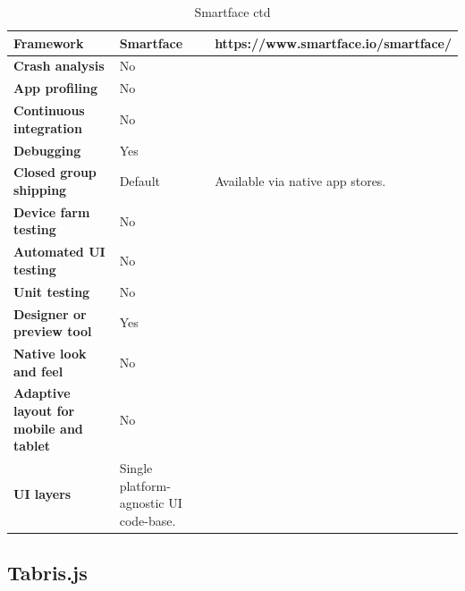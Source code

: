 \documentclass[english,master,public,dept460,male,cpdeclaration,oneside]{diploma}
\begin{document}
\begin{table}[!h]
	\centering
	\caption{Smartface ctd}
	\begin{tabular}{p{} | p{} | p{}}
		\toprule		
		\textbf{Framework} & \textbf{Smartface} & https://www.smartface.io/smartface/ \\
		\midrule
		\textbf{Crash analysis} & No & \\			
		\midrule
		\textbf{App profiling} & No & \\			
		\midrule
		\textbf{Continuous integration} & No & \\			
		\midrule
		\textbf{Debugging} & Yes & \\			
		\midrule
		\textbf{Closed group shipping} & Default & Available via native app stores. \\			
		\midrule
		\textbf{Device farm testing} & No & \\			
		\midrule
		\textbf{Automated UI testing} & No & \\			
		\midrule
		\textbf{Unit testing} & No & \\			
		\midrule
		\textbf{Designer or preview tool} & Yes & \\			
		\midrule
		\textbf{Native look and feel} & No & \\			
		\midrule
		\textbf{Adaptive layout for mobile and tablet} & No & \\			
		\midrule		
		\textbf{UI layers} & Single platform-agnostic UI code-base. & \\			
		\midrule
	\end{tabular}
\end{table}

\clearpage
\subsection{Tabris.js}
\end{document}
